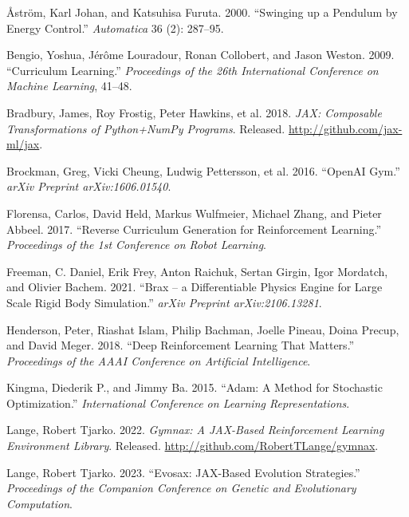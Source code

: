\documentclass[
]{article}
\newlength{\cslhangindent}
\newenvironment{CSLReferences}[2] %
 {\begin{list}{}{%
  \setlength{\itemindent}{0pt}
  \setlength{\leftmargin}{0pt}
  \setlength{\parsep}{0pt}
  \ifodd #1
   \setlength{\leftmargin}{\cslhangindent}
   \setlength{\itemindent}{-1\cslhangindent}
  \fi
  \setlength{\itemsep}{#2\baselineskip}}}
 {\end{list}}
\begin{document}
\protect{}\label{refs}
\begin{CSLReferences}{1}{1}
Åström, Karl Johan, and Katsuhisa Furuta. 2000. {``Swinging up a
Pendulum by Energy Control.''} \emph{Automatica} 36 (2): 287--95.

Bengio, Yoshua, Jérôme Louradour, Ronan Collobert, and Jason Weston.
2009. {``Curriculum Learning.''} \emph{Proceedings of the 26th
International Conference on Machine Learning}, 41--48.

Bradbury, James, Roy Frostig, Peter Hawkins, et al. 2018. \emph{{JAX}:
Composable Transformations of {Python+NumPy} Programs}. Released.
\url{http://github.com/jax-ml/jax}.

Brockman, Greg, Vicki Cheung, Ludwig Pettersson, et al. 2016.
{``{OpenAI} Gym.''} \emph{arXiv Preprint arXiv:1606.01540}.

Florensa, Carlos, David Held, Markus Wulfmeier, Michael Zhang, and
Pieter Abbeel. 2017. {``Reverse Curriculum Generation for Reinforcement
Learning.''} \emph{Proceedings of the 1st Conference on Robot Learning}.

Freeman, C. Daniel, Erik Frey, Anton Raichuk, Sertan Girgin, Igor
Mordatch, and Olivier Bachem. 2021. {``Brax -- a Differentiable Physics
Engine for Large Scale Rigid Body Simulation.''} \emph{arXiv Preprint
arXiv:2106.13281}.

Henderson, Peter, Riashat Islam, Philip Bachman, Joelle Pineau, Doina
Precup, and David Meger. 2018. {``Deep Reinforcement Learning That
Matters.''} \emph{Proceedings of the AAAI Conference on Artificial
Intelligence}.

Kingma, Diederik P., and Jimmy Ba. 2015. {``Adam: A Method for
Stochastic Optimization.''} \emph{International Conference on Learning
Representations}.

Lange, Robert Tjarko. 2022. \emph{Gymnax: A {JAX}-Based Reinforcement
Learning Environment Library}. Released.
\url{http://github.com/RobertTLange/gymnax}.

Lange, Robert Tjarko. 2023. {``Evosax: {JAX}-Based Evolution
Strategies.''} \emph{Proceedings of the Companion Conference on Genetic
and Evolutionary Computation}.


\end{CSLReferences}
\end{document}
